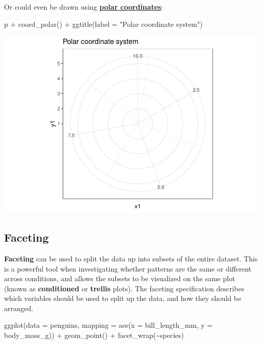 \documentclass[
]{article}
\newenvironment{Shaded}{\begin{snugshade}}{\end{snugshade}}
\newcommand{\AttributeTok}[1]{\textcolor[rgb]{0.77,0.63,0.00}{#1}}
\newcommand{\FunctionTok}[1]{\textcolor[rgb]{0.00,0.00,0.00}{#1}}
\newcommand{\NormalTok}[1]{#1}
\newcommand{\SpecialCharTok}[1]{\textcolor[rgb]{0.00,0.00,0.00}{#1}}
\newcommand{\StringTok}[1]{\textcolor[rgb]{0.31,0.60,0.02}{#1}}
\begin{document}
Or could even be drawn using
\href{https://en.wikipedia.org/wiki/Polar_coordinate_system}{\textbf{polar
coordinates}}:

\begin{Shaded}
\begin{Highlighting}[]
\NormalTok{p }\SpecialCharTok{+}
  \FunctionTok{coord\_polar}\NormalTok{() }\SpecialCharTok{+}
  \FunctionTok{ggtitle}\NormalTok{(}\AttributeTok{label =} \StringTok{"Polar coordinate system"}\NormalTok{)}
\end{Highlighting}
\end{Shaded}

\includegraphics{Grammar-of-Graphics_files/figure-latex/coord_polar-1.pdf}

\hypertarget{faceting}{%
\subsection{Faceting}\label{faceting}}

\textbf{Faceting} can be used to split the data up into subsets of the
entire dataset. This is a powerful tool when investigating whether
patterns are the same or different across conditions, and allows the
subsets to be visualized on the same plot (known as \textbf{conditioned}
or \textbf{trellis} plots). The faceting specification describes which
variables should be used to split up the data, and how they should be
arranged.

\begin{Shaded}
\begin{Highlighting}[]
\FunctionTok{ggplot}\NormalTok{(}\AttributeTok{data =}\NormalTok{ penguins, }\AttributeTok{mapping =} \FunctionTok{aes}\NormalTok{(}\AttributeTok{x =}\NormalTok{ bill\_length\_mm, }\AttributeTok{y =}\NormalTok{ body\_mass\_g)) }\SpecialCharTok{+}
  \FunctionTok{geom\_point}\NormalTok{() }\SpecialCharTok{+}
  \FunctionTok{facet\_wrap}\NormalTok{(}\SpecialCharTok{\textasciitilde{}}\NormalTok{species)}
\end{Highlighting}
\end{Shaded}
\end{document}
